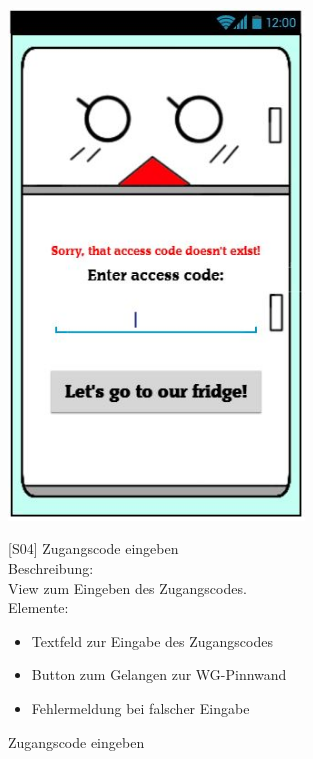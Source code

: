 \documentclass[a4paper]{scrreprt}
\begin{document}
    	\begin{figure}[h!]
    		\begin{minipage}[t]{0.4\linewidth}
    			\flushright
    			\centering
    			\vspace{9mm}
    			\includegraphics[width=0.7\textwidth]{fridget_accesscodeenter.JPG}
    			\caption{Zugangscode eingeben}
    			\label{fig:figure1}
    		\end{minipage}
    		\hspace{0.5cm}
    		\begin{minipage}[t]{0.55\linewidth}
    			\flushleft
    			\vspace{9mm}
    			{[}S04{]} Zugangscode eingeben \\
    			
    			Beschreibung: \\
    			View zum Eingeben des Zugangscodes.
    			\\
    			Elemente:
    			\begin{itemize}
    				\renewcommand\labelitemi{--}
    				\item Textfeld zur Eingabe des Zugangscodes
    				\item Button zum Gelangen zur WG-Pinnwand
    				\item Fehlermeldung bei falscher Eingabe
    			\end{itemize}
    			

\end{minipage}
\end{figure}
\end{document}
